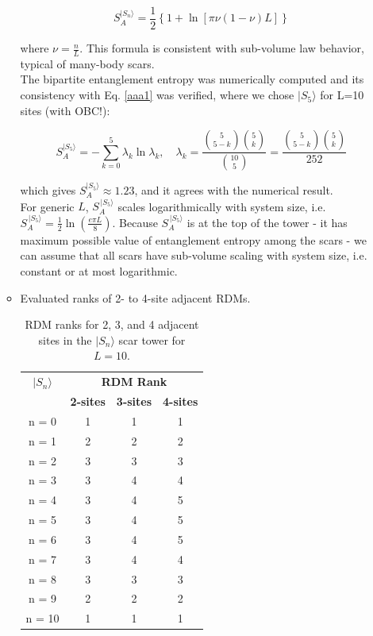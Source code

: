\documentclass[11pt]{article}
\begin{document}
\begin{itemize}
\begin{itemize}
        \begin{equation}
         S^{|S_n\rangle }_A = \frac{1}{2} \left\{ 1+ \ln \left[\pi \nu \left( 1-\nu\right) L\right] \right\}
        \end{equation}
        
        where $\nu=\frac{n}{L}$. This formula is consistent with sub-volume law behavior, typical of many-body scars.\\
        The bipartite entanglement entropy was numerically computed and its consistency with Eq. \eqref{aaa1} was verified, where we chose $|S_5\rangle$ for L=10 sites (with OBC!):
        
        \begin{equation}
        S^{|S_5\rangle }_A = - \sum_{k=0}^{5} \lambda_k \ln \lambda_k, \quad \lambda_k = \frac{\binom{5}{5-k}\binom{5}{k}}{\binom{10}{5}} =  \frac{\binom{5}{5-k}\binom{5}{k}}{252}
        \end{equation}
        
        which gives $S^{|S_5\rangle }_A \approx 1.23$, and it agrees with the numerical result.\\
        
        For generic $L$, $S^{\,|S_5\rangle}_A$ scales logarithmically with system size, i.e. $S^{\,|S_5\rangle}_A = \frac{1}{2} \ln \left(\frac{e \pi L}{8}\right)$. Because $S^{\,|S_5\rangle}_A$ is at the top of the tower - it has maximum possible value of entanglement entropy among the scars - we can assume that all scars have sub-volume scaling with system size, i.e. constant or at most logarithmic.
        
        \item Evaluated ranks of 2- to 4-site adjacent RDMs.
         \begin{table}[H]
	\centering
	\begin{tabular}{|c|ccc|}
	\hline
	\textbf{$|S_n\rangle$} & \multicolumn{3}{c|}{\textbf{RDM Rank}} \\
	\cline{2-4}
	& \textbf{2-sites} & \textbf{3-sites} & \textbf{4-sites}\\
	\hline
	 n = 0 & 1 & 1 & 1 \\
	 n = 1 & 2 & 2 & 2 \\
	 n = 2 & 3 & 3 & 3 \\
	 n = 3 & 3 & 4 & 4 \\
	 n = 4 & 3 & 4 & 5 \\  
	 n = 5 & 3 & 4 & 5 \\
	 n = 6 & 3 & 4 & 5 \\
	 n = 7 & 3 & 4 & 4 \\
	 n = 8 & 3 & 3 & 3 \\
	 n = 9 & 2 & 2 & 2 \\
	 n = 10 & 1 & 1 & 1 \\
	\hline
	\end{tabular}
	\caption{RDM ranks for 2, 3, and 4 adjacent sites in the $|S_n\rangle$ scar tower for $L=10$.}
	\label{tab:ranks21}
	\end{table}


\end{itemize}
\end{itemize}
\end{document}
